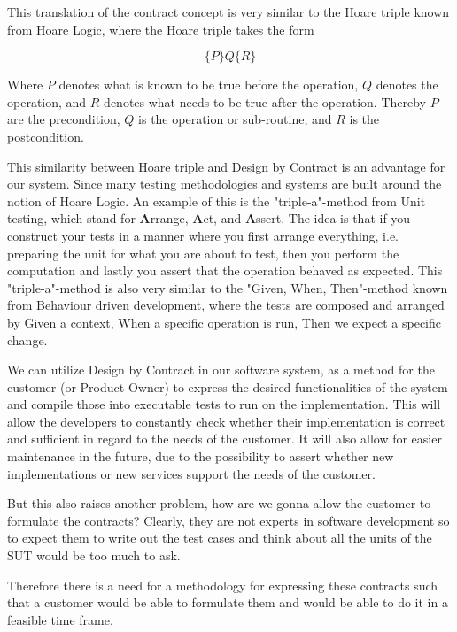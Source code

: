 This translation of the contract concept is very similar to the Hoare triple known from Hoare Logic, where the Hoare triple takes the form

\begin{equation}
\{P\} Q \{R\}
\end{equation}

Where $P$ denotes what is known to be true before the operation, $Q$ denotes the operation, and $R$ denotes what needs to be true after the operation. Thereby $P$ are the precondition, $Q$ is the operation or sub-routine, and $R$ is the postcondition. 

This similarity between Hoare triple and Design by Contract is an advantage for our system. Since many testing methodologies and systems are built around the notion of Hoare Logic. 
An example of this is the "triple-a"-method from Unit testing, which stand for \textbf{A}rrange, \textbf{A}ct, and \textbf{A}ssert.
The idea is that if you construct your tests in a manner where you first arrange everything, i.e. preparing the unit for what you are about to test, then you perform the computation and lastly you assert that the operation behaved as expected. 
This "triple-a"-method is also very similar to the "Given, When, Then"-method known from Behaviour driven development, where the tests are composed and arranged by Given a context, When a specific operation is run, Then we expect a specific change. 

We can utilize Design by Contract in our software system, as a method for the customer (or Product Owner) to express the desired functionalities of the system and compile those into executable tests to run on the implementation. 
This will allow the developers to constantly check whether their implementation is correct and sufficient in regard to the needs of the customer. 
It will also allow for easier maintenance in the future, due to the possibility to assert whether new implementations or new services support the needs of the customer.

But this also raises another problem, how are we gonna allow the customer to formulate the contracts? 
Clearly, they are not experts in software development so to expect them to write out the test cases and think about all the units of the SUT would be too much to ask.

Therefore there is a need for a methodology for expressing these contracts such that a customer would be able to formulate them and would be able to do it in a feasible time frame.